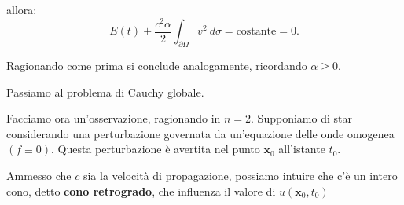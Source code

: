 \documentclass[10pt,a4paper,twoside,openright]{book}
\begin{document}
\begin{dimostrazione}
\begin{itemize}
		      allora:
		      \begin{equation*}
		      	E( t) +\frac{c^{2} \alpha }{2}\int _{\partial \Omega } v^{2} \ d\sigma =\text{costante} =0.
		      \end{equation*}
		      
		      Ragionando come prima si conclude analogamente, ricordando $\alpha \geqslant 0$.
	\end{itemize}
\end{dimostrazione}


Passiamo al problema di Cauchy globale.

Facciamo ora un'osservazione, ragionando in $n=2$. Supponiamo di star considerando una perturbazione governata da un'equazione delle onde omogenea $( f\equiv 0)$. Questa perturbazione è avertita nel punto $\mathbf{x}_{0}$ all'istante $t_{0}$.

Ammesso che $c$ sia la velocità di propagazione, possiamo intuire che c'è un intero cono, detto \textbf{cono retrogrado}, che influenza il valore di $u(\mathbf{x}_{0} ,t_{0})$

\end{document}
